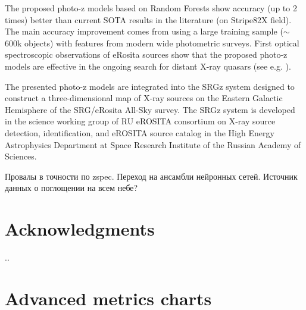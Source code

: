 \documentclass[fleqn,usenatbib]{mnras}
\begin{document}

The proposed photo-z models based on Random Forests show accuracy (up to 2 times) better than current SOTA results in the literature (on Stripe82X field). The main accuracy improvement comes from using a large training sample ($\sim$600k objects) with features from modern wide photometric surveys. First optical spectroscopic observations of eRosita sources show that the proposed photo-z models are effective in the ongoing search for distant X-ray quasars (see e.g. \citep{2020MNRAS.497.1842M,2020AstL...46..149K,2020AstL...46..429D}).

The presented photo-z models are integrated into the SRGz system designed to construct a three-dimensional map of X-ray sources on the Eastern Galactic Hemisphere of the SRG/eRosita All-Sky survey. The SRGz system is developed in the science working group of RU eROSITA consortium on X-ray source detection, identification, and eROSITA source catalog in the High Energy Astrophysics Department at Space Research Institute of the Russian Academy of Sciences.


Провалы в точности по zspec. Переход на ансамбли нейронных сетей. Источник данных о поглощении на всем небе?

\section*{Acknowledgments}
..




\appendix

\section{Advanced metrics charts}
\end{document}
